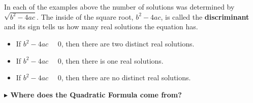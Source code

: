 \documentclass{ximera}
\begin{document}
In each of the examples above the number of solutions was determined by $\sqrt{b^2 - 4 a c}$.  The inside of the square root, $b^2 - 4 a c$, is called the \textbf{discriminant} and its sign tells us how many real solutions the equation has.


\begin{itemize}
\item If $b^2 - 4 a c$ \, \wordChoice{\choice[correct]{$>$}\choice{$=$}\choice{$<$}} \, $0$, then there are two distinct real solutions.
\item If $b^2 - 4 a c$ \, \wordChoice{\choice{$>$}\choice[correct]{$=$}\choice{$<$}} \, $0$, then there is one real solutions.
\item If $b^2 - 4 a c$ \, \wordChoice{\choice{$>$}\choice{$=$}\choice[correct]{$<$}} \, $0$, then there are no distinct real solutions.

\end{itemize}








\textbf{\textcolor{blue!55!black}{$\blacktriangleright$ Where does the Quadratic Formula come from?}} 
\end{document}
